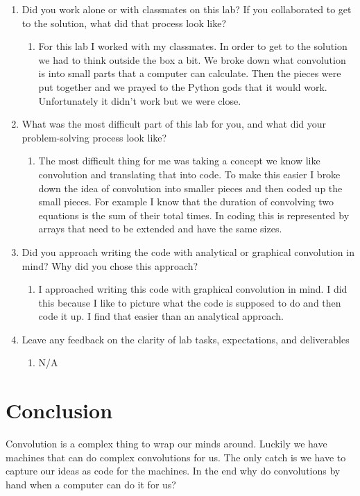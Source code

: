 \documentclass[12pt]{article}
\begin{document}
\begin{enumerate}
    \item Did you work alone or with classmates on this lab? If you collaborated to get to the solution,
what did that process look like?
    \begin{enumerate}
        \item For this lab I worked with my classmates.  In order to get to the solution we had to think outside the box a bit. We broke down what convolution is into small parts that a computer can calculate. Then the pieces were put together and we prayed to the Python gods that it would work. Unfortunately it didn't work but we were close.
    \end{enumerate}
    \item What was the most difficult part of this lab for you, and what did your problem-solving
process look like?
    \begin{enumerate}
        \item The most difficult thing for me was taking a concept we know like convolution and translating that into code. To make this easier I broke down the idea of convolution into smaller pieces and then coded up the small pieces. For example I know that the duration of convolving two equations is the sum of their total times. In coding this is represented by arrays that need to be extended and have the same sizes.
    \end{enumerate}
    \item Did you approach writing the code with analytical or graphical convolution in mind? Why
did you chose this approach?
    \begin{enumerate}
        \item I approached writing this code with graphical convolution in mind. I did this because I like to picture what the code is supposed to do and then code it up. I find that easier than an analytical approach.
    \end{enumerate}
    \item Leave any feedback on the clarity of lab tasks, expectations, and deliverables
    \begin{enumerate}
        \item N/A
    \end{enumerate}
\end{enumerate}

\section*{Conclusion}

Convolution is a complex thing to wrap our minds around. Luckily we have machines that can do complex convolutions for us. The only catch is we have to capture our ideas as code for the machines. In the end why do convolutions by hand when a computer can do it for us?
\end{document}

